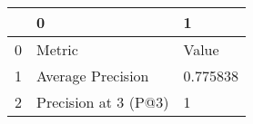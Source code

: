 \begin{tabular}{lll}
\toprule
{} &                     0 &         1 \\
\midrule
0 &                Metric &     Value \\
1 &     Average Precision &  0.775838 \\
2 &  Precision at 3 (P@3) &         1 \\
\bottomrule
\end{tabular}
